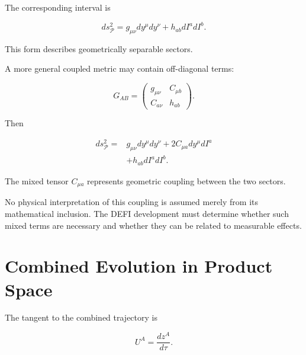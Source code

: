 \documentclass[12pt,oneside]{book}
\begin{document}
The corresponding interval is

\begin{equation}
    ds_{\mathcal{P}}^2
    =
    g_{\mu\nu}
    dy^\mu dy^\nu
    +
    h_{ab}
    dI^a dI^b.
    \label{eq:product-line-element}
\end{equation}

This form describes geometrically separable sectors.

A more general coupled metric may contain off-diagonal terms:

\begin{equation}
    G_{AB}
    =
    \begin{pmatrix}
        g_{\mu\nu}
        &
        C_{\mu b}
        \\
        C_{a\nu}
        &
        h_{ab}
    \end{pmatrix}.
    \label{eq:coupled-product-metric}
\end{equation}

Then

\begin{equation}
\begin{aligned}
    ds_{\mathcal{P}}^2
    ={}&
    g_{\mu\nu}
    dy^\mu dy^\nu
    +
    2C_{\mu a}
    dy^\mu dI^a
    \\
    &+
    h_{ab}
    dI^a dI^b.
\end{aligned}
\label{eq:coupled-product-line-element}
\end{equation}

The mixed tensor \(C_{\mu a}\) represents geometric coupling
between the two sectors.

No physical interpretation of this coupling is assumed merely
from its mathematical inclusion. The DEFI development must
determine whether such mixed terms are necessary and whether
they can be related to measurable effects.


\section{Combined Evolution in Product Space}
\label{sec:combined-product-evolution}

The tangent to the combined trajectory is

\begin{equation}
    U^A
    =
    \frac{dz^A}{d\tau}.
    \label{eq:product-space-velocity}
\end{equation}
\end{document}
